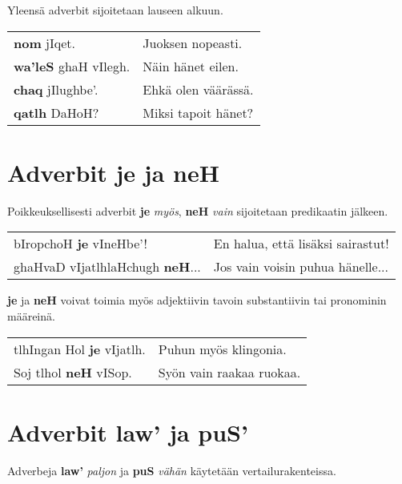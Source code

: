 \documentclass{book}
\begin{document}
Yleensä adverbit sijoitetaan lauseen alkuun.

\begin{tabular}{l l}
    \textbf{nom} jIqet. & Juoksen nopeasti. \\
    \textbf{wa'leS} ghaH vIlegh. & Näin hänet eilen. \\
    \textbf{chaq} jIlughbe'. & Ehkä olen väärässä. \\
    \textbf{qatlh} DaHoH? & Miksi tapoit hänet? \\
\end{tabular}

\section{Adverbit je ja neH}

Poikkeuksellisesti adverbit \textbf{je} \textit{myös}, \textbf{neH} \textit{vain} sijoitetaan predikaatin jälkeen.

\begin{tabular}{l l}
    bIropchoH \textbf{je} vIneHbe'! & En halua, että lisäksi sairastut! \\
    ghaHvaD vIjatlhlaHchugh \textbf{neH}... & Jos vain voisin puhua hänelle... \\
\end{tabular}

\textbf{je} ja \textbf{neH} voivat toimia myös adjektiivin tavoin substantiivin tai pronominin määreinä.

\begin{tabular}{l l}
    tlhIngan Hol \textbf{je} vIjatlh. & Puhun myös klingonia. \\
    Soj tlhol \textbf{neH} vISop. & Syön vain raakaa ruokaa. \\
\end{tabular}


\section{Adverbit law' ja puS'}

Adverbeja \textbf{law'} \textit{paljon} ja \textbf{puS} \textit{vähän} käytetään vertailurakenteissa.
\end{document}

